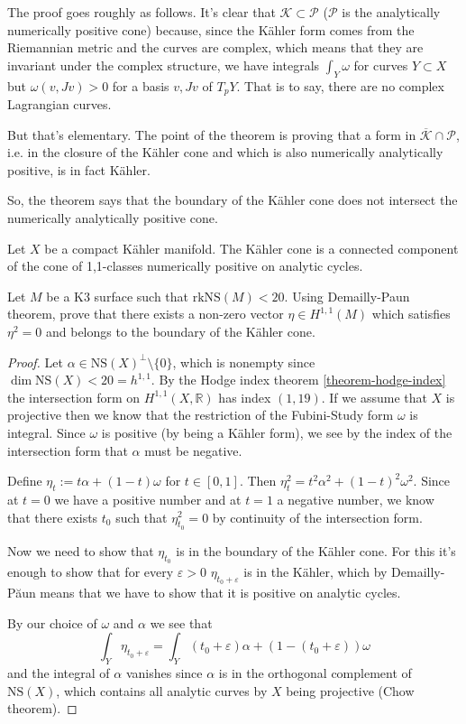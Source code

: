 The proof goes roughly as follows.
It's clear that $\mathcal{K} \subset \mathcal{P}$
($\mathcal{P}$ is the analytically numerically positive cone)
because, since the Kähler form
comes from the Riemannian metric
and the curves are complex,
which means that they are invariant under
the complex structure,
we have integrals
$\int_Y\omega$ for curves $Y \subset X$ 
but $\omega(v,Jv)>0$ for a basis $v,Jv$ 
of $T_pY$.
That is to say, there are no complex
Lagrangian curves.

But that's elementary.
The point of the theorem is proving that
a form in $\overline{\mathcal{K}}\cap \mathcal{P}$,
i.e. in the closure of the Kähler cone
and which is also numerically analytically positive,
is in fact Kähler.

So, the theorem says that the boundary of the Kähler cone does
not intersect the numerically analytically positive cone.

\begin{theorem}[Demailly-Pa\u un]
\label{theorem-demailly-paun}
Let $X$ be a compact Kähler manifold.
The Kähler cone is a connected component
of the cone of 1,1-classes numerically positive on
analytic cycles.
\end{theorem}

\begin{exercise}
\label{exercise-demailly-paun}
Let $M$ be a K3 surface such that $\text{rk}\text{NS}(M)<20$.
Using Demailly-Paun theorem,
prove that there exists a non-zero vector
$\eta \in H^{1,1}(M)$ which satisfies $\eta^2=0$ 
and belongs to the boundary of the Kähler cone.
\end{exercise}

\begin{proof}
Let $\alpha \in \text{NS}(X)^{\perp}\setminus\{0\}$,
which is nonempty since $\dim \text{NS}(X)<20=h^{1,1}$.
By the Hodge index theorem \ref{theorem-hodge-index}
the intersection form on $H^{1,1}(X,\mathbb{R})$
has index $(1,19)$.
If we assume that $X$ is projective
then we know that the restriction of
the Fubini-Study form $\omega$ is integral.
Since $\omega$ is positive (by being a Kähler form),
we see by the index of the intersection form
that $\alpha$ must be negative.

Define $\eta_t:=t\alpha+(1-t)\omega$ for $t\in[0,1]$.
Then $\eta_t^2=t^2\alpha^2+(1-t)^2\omega^2$.
Since at $t=0$ we have a positive number
and at  $t=1$ a negative number,
we know that there exists  $t_0$ 
such that $\eta_{t_0}^2=0$
by continuity of the intersection form.

Now we need to show that $\eta_{t_0}$ is
in the boundary of the Kähler cone.
For this it's enough to show that for every $\varepsilon>0$ 
$\eta_{t_0+\varepsilon}$ is in the Kähler, which
by Demailly-P\u aun
means that we have to show
that it is positive on analytic cycles.

By our choice of $\omega$ and $\alpha$ 
we see that
$$
\int_Y \eta_{t_0+\varepsilon}
=\int_Y (t_0+\varepsilon)\alpha+(1-(t_0+\varepsilon))\omega
$$
and the integral of $\alpha$ vanishes
since $\alpha$ is in the orthogonal complement
of $\text{NS}(X)$, which contains
all analytic curves by $X$ being projective
(Chow theorem).
\end{proof}




